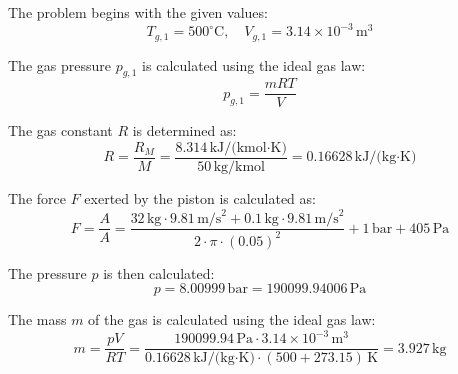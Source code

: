 The problem begins with the given values:  
\[
T_{g,1} = 500^\circ\text{C}, \quad V_{g,1} = 3.14 \times 10^{-3} \, \text{m}^3
\]  

The gas pressure \( p_{g,1} \) is calculated using the ideal gas law:  
\[
p_{g,1} = \frac{mRT}{V}
\]  

The gas constant \( R \) is determined as:  
\[
R = \frac{R_M}{M} = \frac{8.314 \, \text{kJ/(kmol·K)}}{50 \, \text{kg/kmol}} = 0.16628 \, \text{kJ/(kg·K)}
\]  

The force \( F \) exerted by the piston is calculated as:  
\[
F = \frac{A}{A} = \frac{32 \, \text{kg} \cdot 9.81 \, \text{m/s}^2 + 0.1 \, \text{kg} \cdot 9.81 \, \text{m/s}^2}{2 \cdot \pi \cdot (0.05)^2} + 1 \, \text{bar} + 405 \, \text{Pa}
\]  

The pressure \( p \) is then calculated:  
\[
p = 8.00999 \, \text{bar} = 190099.94006 \, \text{Pa}
\]  

The mass \( m \) of the gas is calculated using the ideal gas law:  
\[
m = \frac{pV}{RT} = \frac{190099.94 \, \text{Pa} \cdot 3.14 \times 10^{-3} \, \text{m}^3}{0.16628 \, \text{kJ/(kg·K)} \cdot (500 + 273.15) \, \text{K}} = 3.927 \, \text{kg}
\]